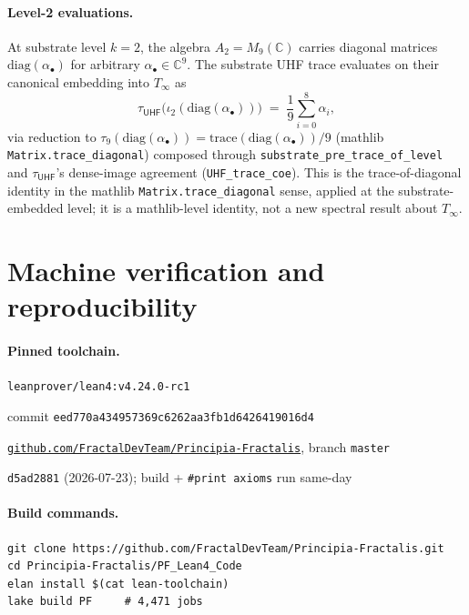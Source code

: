 \documentclass[11pt,a4paper]{amsart}
\theoremstyle{plain}
\theoremstyle{definition}
\begin{document}
\paragraph{Level-2 evaluations.} At substrate level $k = 2$, the algebra $A_2 = M_9(\mathbb{C})$ carries diagonal matrices $\mathrm{diag}(\alpha_\bullet)$ for arbitrary $\alpha_\bullet \in \mathbb{C}^9$. The substrate UHF trace evaluates on their canonical embedding into $T_\infty$ as
\[
\tau_{\textsf{UHF}}\bigl(\iota_2(\mathrm{diag}(\alpha_\bullet))\bigr) \;=\; \frac{1}{9} \sum_{i=0}^{8} \alpha_i,
\]
via reduction to $\tau_9(\mathrm{diag}(\alpha_\bullet)) = \mathrm{trace}(\mathrm{diag}(\alpha_\bullet))/9$ (mathlib \texttt{Matrix.trace\_diagonal}) composed through \texttt{substrate\_pre\_trace\_of\_level} and $\tau_{\textsf{UHF}}$'s dense-image agreement (\texttt{UHF\_trace\_coe}). This is the trace-of-diagonal identity in the mathlib \texttt{Matrix.trace\_diagonal} sense, applied at the substrate-embedded level; it is a mathlib-level identity, not a new spectral result about $T_\infty$.

\section{Machine verification and reproducibility}\label{sec:reproducibility}

\paragraph{Pinned toolchain.}
\begin{description}[font=\normalfont\bfseries,leftmargin=2em,itemsep=2pt]
\item[Lean toolchain] \texttt{leanprover/lean4:v4.24.0-rc1}
\item[mathlib revision] commit \texttt{eed770a434957369c6262aa3fb1d6426419016d4}
\item[Repository] \href{https://github.com/FractalDevTeam/Principia-Fractalis}{\texttt{github.com/FractalDevTeam/Principia-Fractalis}}, branch \texttt{master}
\item[HEAD reference (verified)] \texttt{d5ad2881} (2026-07-23); build + \texttt{\#print axioms} run same-day
\end{description}

\paragraph{Build commands.}
\begin{verbatim}
git clone https://github.com/FractalDevTeam/Principia-Fractalis.git
cd Principia-Fractalis/PF_Lean4_Code
elan install $(cat lean-toolchain)
lake build PF     # 4,471 jobs
\end{verbatim}
\end{document}
